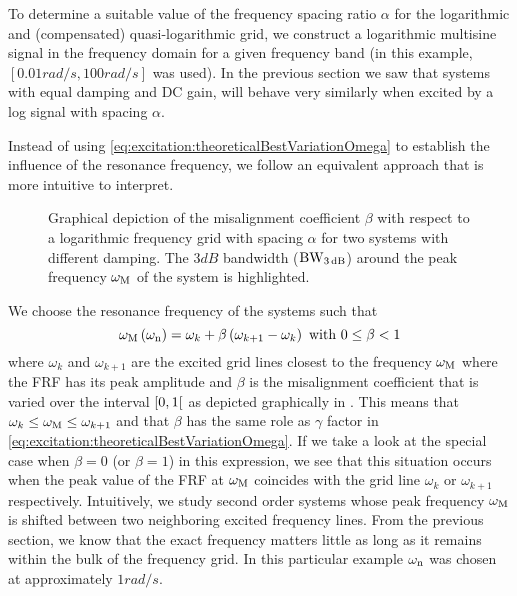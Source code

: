   To determine a suitable value of the frequency spacing ratio $\alpha$ for the logarithmic and (compensated) quasi-logarithmic grid, we construct a logarithmic multisine signal in the frequency domain for a given frequency band (in this example, $\left[ 0.01 \unit{rad/s}, 100 \unit{rad/s}\right]$ was used).
  In the previous section we saw that systems with equal damping and \gls{DC} gain, will behave very similarly when excited by a log signal with spacing $\alpha$.

  Instead of using \eqref{eq:excitation:theoreticalBestVariationOmega} to establish the influence of the resonance frequency, we follow an equivalent approach that is more intuitive to interpret.

  \begin{figure}
    \centering
      \setlength{}
      \setlength\figureheight{0.5\figurewidth}
    
    \caption[Depiction of the grid misalignment $\beta$ for a logarithmic multisine.]{Graphical depiction of the misalignment coefficient $\beta$ with respect to a logarithmic frequency grid with spacing $\alpha$ for two systems with different damping.
    The $3\unit{dB}$ bandwidth ($\mathrm{BW}_{3\,\mathrm{dB}}$) around the peak frequency $\omega_{\mathrm{M}}$ of the system is highlighted.}
    \label{fig:excitation:misalignment-logms}
  \end{figure}


  We choose the resonance frequency of the systems such that
  \begin{equation}
   \omega_{\mathrm{M}}\left( \omega_{\mathrm{n}} \right)  = \omega_k + \beta \left( \omega_{k+1} - \omega_k \right)
   \text{ with } 0 \leq \beta < 1
   \label{eq:excitation:chosenVariationOmega}
  \end{equation}
  where $\omega_k$ and $\omega_{k+1}$ are the excited grid lines closest to the frequency $\omega_{\mathrm{M}}$ where the FRF has its peak amplitude and $\beta$ is the misalignment coefficient that is varied over the interval $\left[ 0,1 \right[$ as depicted graphically in .
  This means that $\omega_k \leq \omega_{\mathrm{M}} \leq \omega_{k+1}$ and that $\beta$ has the same role as $\gamma$ factor in \eqref{eq:excitation:theoreticalBestVariationOmega}.
  If we take a look at the special case when $\beta=0$ (or $\beta=1$) in this expression, we see that this situation occurs when the peak value of the \gls{FRF} at $\omega_{\mathrm{M}}$ coincides with the grid line $\omega_k$ or $\omega_{k+1}$ respectively.
  Intuitively, we study second order systems whose peak frequency $\omega_{\mathrm{M}}$ is shifted between two neighboring excited frequency lines.
  From the previous section, we know that the exact frequency matters little as long as it remains within the bulk of the frequency grid.
  In this particular example $\omega_{\mathrm{n}}$ was chosen at approximately $1 \unit{rad/s}$.

